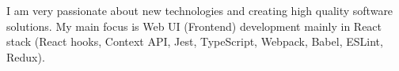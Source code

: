 

\begin{cvparagraph}

I am very passionate about new technologies and creating high quality software solutions. My main focus is Web UI (Frontend) development mainly in React stack (React hooks, Context API, Jest, TypeScript, Webpack, Babel, ESLint, Redux).
\end{cvparagraph}
